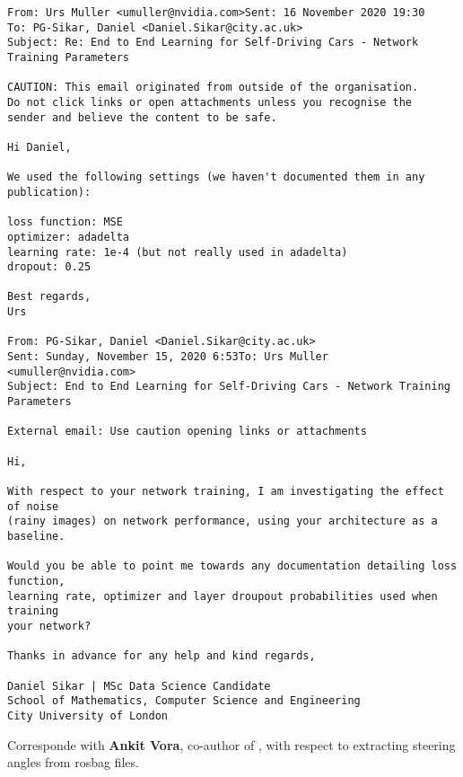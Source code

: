 \begin{verbatim}
From: Urs Muller <umuller@nvidia.com>Sent: 16 November 2020 19:30
To: PG-Sikar, Daniel <Daniel.Sikar@city.ac.uk>
Subject: Re: End to End Learning for Self-Driving Cars - Network Training Parameters

CAUTION: This email originated from outside of the organisation. 
Do not click links or open attachments unless you recognise the
sender and believe the content to be safe.

Hi Daniel,

We used the following settings (we haven't documented them in any publication):

loss function: MSE
optimizer: adadelta
learning rate: 1e-4 (but not really used in adadelta)
dropout: 0.25

Best regards,
Urs

From: PG-Sikar, Daniel <Daniel.Sikar@city.ac.uk>
Sent: Sunday, November 15, 2020 6:53To: Urs Muller <umuller@nvidia.com>
Subject: End to End Learning for Self-Driving Cars - Network Training Parameters
 
External email: Use caution opening links or attachments

Hi,

With respect to your network training, I am investigating the effect of noise 
(rainy images) on network performance, using your architecture as a baseline.

Would you be able to point me towards any documentation detailing loss function, 
learning rate, optimizer and layer droupout probabilities used when training 
your network?

Thanks in advance for any help and kind regards,

Daniel Sikar | MSc Data Science Candidate
School of Mathematics, Computer Science and Engineering
City University of London    
\end{verbatim}

Corresponde with \textbf{Ankit Vora}, co-author of \cite{agarwal2020ford}, with respect to extracting steering angles from rosbag files.


